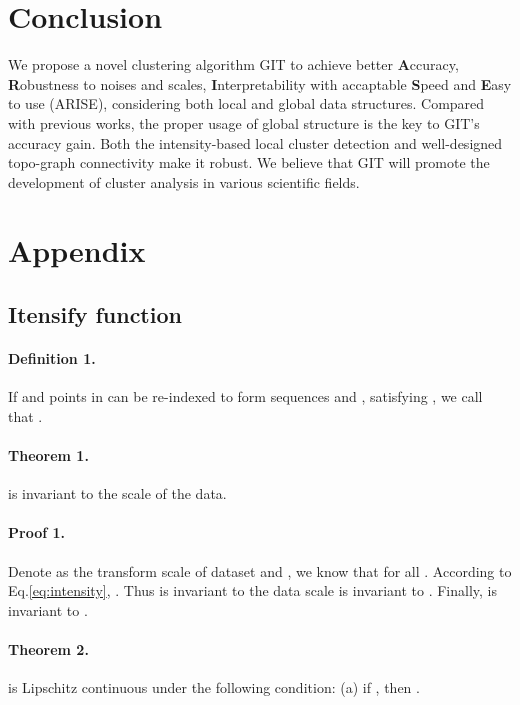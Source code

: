 \documentclass[letterpaper]{article} \usepackage{aaai22}  \usepackage{times}  \usepackage{helvet}  \usepackage{courier}  \usepackage[hyphens]{url}  \usepackage{graphicx} \urlstyle{rm} \def\UrlFont{\rm}  \usepackage{natbib}  \usepackage{caption} \DeclareCaptionStyle{ruled}{labelfont=normalfont,labelsep=colon,strut=off} \frenchspacing  \setlength{\pdfpagewidth}{8.5in}  \setlength{\pdfpageheight}{11in}  \usepackage{subfigure}
\begin{document}
\vspace{-2mm}
\section{Conclusion}
We  propose  a  novel  clustering  algorithm GIT to  achieve  better \textbf{A}ccuracy, \textbf{R}obustness to noises and scales, \textbf{I}nterpretability with accaptable \textbf{S}peed and \textbf{E}asy to use (ARISE), considering both local and global data structures. Compared with previous works, the proper usage of global structure is the key to GIT's accuracy gain. Both the intensity-based local cluster detection and well-designed topo-graph connectivity make it robust. We believe that GIT will promote the development of cluster analysis in various scientific fields.


\newpage
\newpage



\clearpage
{}
\section{Appendix}
\subsection{Itensify function}
\label{sup:idensity_function}

\paragraph{Definition 1.} 
If  and points in  can be re-indexed to form sequences  and , satisfying , we call that .

\paragraph{Theorem 1.}  is invariant to the scale of the data.

\paragraph{Proof 1.} Denote  as the transform scale of dataset and , we know that  for all . According to Eq.\ref{eq:intensity}, 
. Thus  is invariant to the data scale    is invariant to . Finally,  is invariant to .

\paragraph{Theorem 2.}  is Lipschitz continuous under the following condition: (a) if , then .
\end{document}
